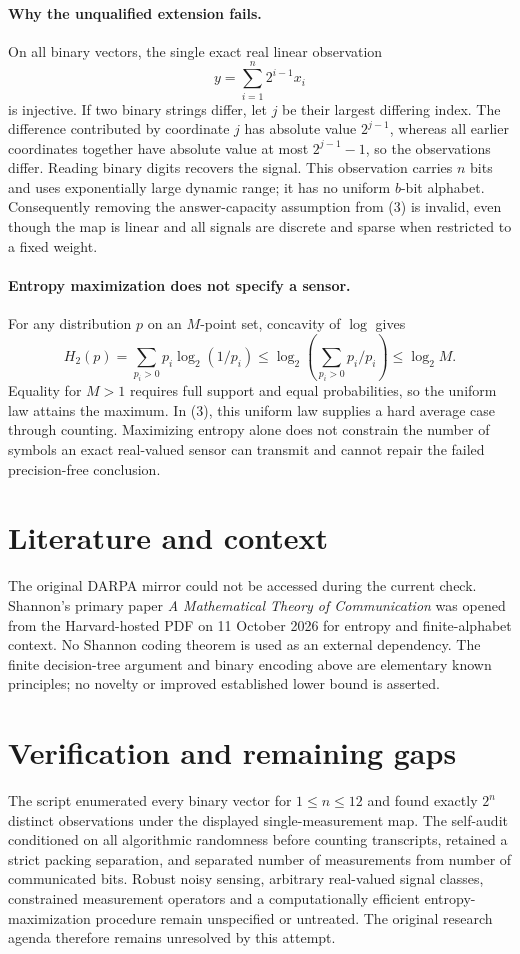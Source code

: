 \documentclass[11pt]{article}
\begin{document}
\paragraph{Why the unqualified extension fails.}
On all binary vectors, the single exact real linear observation
\[
 y=\sum_{i=1}^n2^{i-1}x_i
\]
is injective. If two binary strings differ, let $j$ be their largest differing index. The difference contributed by coordinate $j$ has absolute value $2^{j-1}$, whereas all earlier coordinates together have absolute value at most $2^{j-1}-1$, so the observations differ. Reading binary digits recovers the signal. This observation carries $n$ bits and uses exponentially large dynamic range; it has no uniform $b$-bit alphabet. Consequently removing the answer-capacity assumption from (3) is invalid, even though the map is linear and all signals are discrete and sparse when restricted to a fixed weight.

\paragraph{Entropy maximization does not specify a sensor.}
For any distribution $p$ on an $M$-point set, concavity of $\log$ gives
\[
 H_2(p)=\sum_{p_i>0}p_i\log_2(1/p_i)
 \le\log_2\left(\sum_{p_i>0}p_i/p_i\right)
 \le\log_2M.
\]
Equality for $M>1$ requires full support and equal probabilities, so the uniform law attains the maximum. In (3), this uniform law supplies a hard average case through counting. Maximizing entropy alone does not constrain the number of symbols an exact real-valued sensor can transmit and cannot repair the failed precision-free conclusion.

\section{Literature and context}
The original DARPA mirror could not be accessed during the current check. Shannon's primary paper \emph{A Mathematical Theory of Communication} was opened from the Harvard-hosted PDF on 11 October 2026 for entropy and finite-alphabet context. No Shannon coding theorem is used as an external dependency. The finite decision-tree argument and binary encoding above are elementary known principles; no novelty or improved established lower bound is asserted.

\section{Verification and remaining gaps}
The script enumerated every binary vector for $1\le n\le12$ and found exactly $2^n$ distinct observations under the displayed single-measurement map. The self-audit conditioned on all algorithmic randomness before counting transcripts, retained a strict packing separation, and separated number of measurements from number of communicated bits. Robust noisy sensing, arbitrary real-valued signal classes, constrained measurement operators and a computationally efficient entropy-maximization procedure remain unspecified or untreated. The original research agenda therefore remains unresolved by this attempt.
\end{document}

